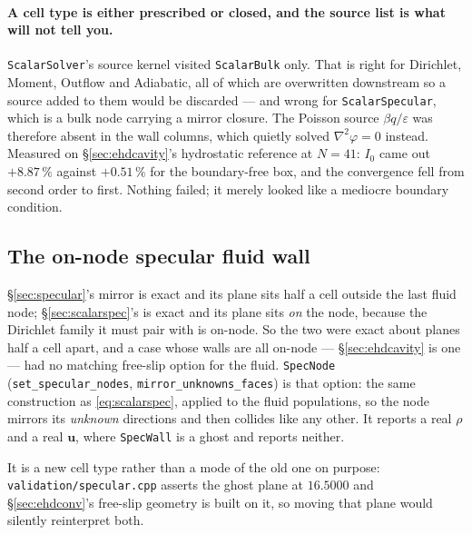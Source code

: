 \documentclass[11pt,a4paper]{article}
\newcommand{\code}[1]{\texttt{\small #1}}
\newcommand{\uu}{\bm{u}}
\begin{document}
\paragraph{A cell type is either prescribed or closed, and the source list is
what will not tell you.} \code{ScalarSolver}'s source kernel visited
\code{ScalarBulk} only. That is right for Dirichlet, Moment, Outflow and
Adiabatic, all of which are overwritten downstream so a source added to them
would be discarded --- and wrong for \code{ScalarSpecular}, which is a bulk node
carrying a mirror closure. The Poisson source $\beta q/\varepsilon$ was therefore
absent in the wall columns, which quietly solved $\nabla^2\varphi=0$ instead.
Measured on \S\ref{sec:ehdcavity}'s hydrostatic reference at $N=41$: $I_0$ came
out $+8.87\,\%$ against $+0.51\,\%$ for the boundary-free box, and the
convergence fell from second order to first. Nothing failed; it merely looked
like a mediocre boundary condition.

\subsection{The on-node specular fluid wall}
\label{sec:specnode}

\S\ref{sec:specular}'s mirror is exact and its plane sits half a cell outside the
last fluid node; \S\ref{sec:scalarspec}'s is exact and its plane sits \emph{on}
the node, because the Dirichlet family it must pair with is on-node. So the two
were exact about planes half a cell apart, and a case whose walls are all
on-node --- \S\ref{sec:ehdcavity} is one --- had no matching free-slip option
for the fluid. \code{SpecNode} (\code{set\_specular\_nodes},
\code{mirror\_unknowns\_faces}) is that option: the same construction as
\eqref{eq:scalarspec}, applied to the fluid populations, so the node mirrors its
\emph{unknown} directions and then collides like any other. It reports a real
$\rho$ and a real $\uu$, where \code{SpecWall} is a ghost and reports neither.

It is a new cell type rather than a mode of the old one on purpose:
\code{validation/specular.cpp} asserts the ghost plane at $16.5000$ and
\S\ref{sec:ehdconv}'s free-slip geometry is built on it, so moving that plane
would silently reinterpret both.
\end{document}

